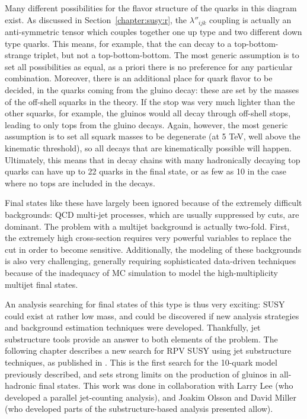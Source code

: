 Many different possibilities for the flavor structure of the quarks in this diagram exist. As discussed in Section~\ref{chapter:susy:r}, the  $\lambda''_{ijk}$ coupling is actually an anti-symmetric tensor which couples together one up type and two different down type quarks. This means, for example, that the \lsp can decay to a top-bottom-strange triplet, but not a top-bottom-bottom. The most generic assumption is to set all possibilities as equal, as a priori there is no preference for any particular combination. Moreover, there is an additional place for quark flavor to be decided, in the quarks coming from the gluino decay: these are set by the masses of the off-shell squarks in the theory. If the stop was very much lighter than the other squarks, for example, the gluinos would all decay through off-shell stops, leading to only tops from the gluino decays. Again, however, the most generic assumption is to set all squark masses to be degenerate (at 5 TeV, well above the kinematic threshold), so all decays that are kinematically possible will happen. Ultimately, this means that in decay chains with many hadronically decaying top quarks can have up to 22 quarks in the final state, or as few as 10 in the case where no tops are included in the decays. 

Final states like these have largely been ignored because of the extremely difficult backgrounds: QCD multi-jet processes, which are usually suppressed by \met cuts, are dominant. The problem with a multijet background is actually two-fold. First, the extremely high cross-section requires very powerful variables to replace the \met cut in order to become sensitive. Additionally, the modeling of these backgrounds is also very challenging, generally requiring sophisticated data-driven techniques because of the inadequacy of MC simulation to model the high-multiplicity multijet final states.

An analysis searching for final states of this type is thus very exciting: SUSY could exist at rather low mass, and could be discovered if new analysis strategies and background estimation techniques were developed. Thankfully, jet substructure tools provide an answer to both elements of the problem. The following chapter describes a new search for RPV SUSY using jet substructure techniques, as published in \cite{RPVSUSY}. This is the first search for the 10-quark model previously described, and sets strong limits on the production of gluinos in all-hadronic final states. This work was done in collaboration with Larry Lee (who developed a parallel jet-counting analysis), and Joakim Olsson and David Miller (who developed parts of the substructure-based analysis presented allow).

